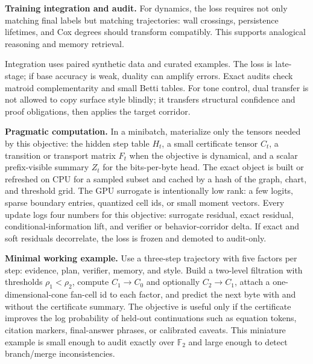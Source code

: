 \documentclass[10pt]{article}
\newcommand{\FF}{\mathbb{F}}
\numberwithin{equation}{section}
\begin{document}
\noindent\textbf{Training integration and audit.} For dynamics, the loss requires not only matching final labels but matching trajectories: wall crossings, persistence lifetimes, and Cox degrees should transform compatibly. This supports analogical reasoning and memory retrieval.

Integration uses paired synthetic data and curated examples. The loss is late-stage; if base accuracy is weak, duality can amplify errors. Exact audits check matroid complementarity and small Betti tables. For tone control, dual transfer is not allowed to copy surface style blindly; it transfers structural confidence and proof obligations, then applies the target corridor.

\noindent\textbf{Pragmatic computation.} In a minibatch, materialize only the tensors needed by this objective: the hidden step table $H_t$, a small certificate tensor $C_t$, a transition or transport matrix $F_t$ when the objective is dynamical, and a scalar prefix-visible summary $Z_t$ for the bits-per-byte head. The exact object is built or refreshed on CPU for a sampled subset and cached by a hash of the graph, chart, and threshold grid. The GPU surrogate is intentionally low rank: a few logits, sparse boundary entries, quantized cell ids, or small moment vectors. Every update logs four numbers for this objective: surrogate residual, exact residual, conditional-information lift, and verifier or behavior-corridor delta. If exact and soft residuals decorrelate, the loss is frozen and demoted to audit-only.

\noindent\textbf{Minimal working example.} Use a three-step trajectory with five factors per step: evidence, plan, verifier, memory, and style. Build a two-level filtration with thresholds $\rho_1<\rho_2$, compute $C_1\to C_0$ and optionally $C_2\to C_1$, attach a one-dimensional-cone fan-cell id to each factor, and predict the next byte with and without the certificate summary. The objective is useful only if the certificate improves the log probability of held-out continuations such as equation tokens, citation markers, final-answer phrases, or calibrated caveats. This miniature example is small enough to audit exactly over $\FF_2$ and large enough to detect branch/merge inconsistencies.
\end{document}
